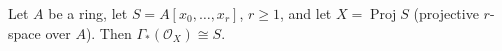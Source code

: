 Let $A$ be a ring, let $S = A[x_0, \ldots, x_r]$, $r \geqslant 1$, and let $X = \operatorname{Proj} S$ (projective $r$-space over $A$). Then $\Gamma_*(\mathcal{O}_X) \cong S$.
